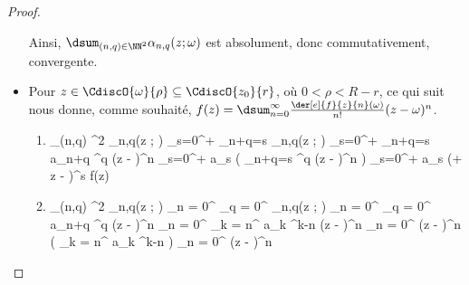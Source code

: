 \begin{proof}
\begin{itemize}
		\noindent
		Ainsi,
		$\dsum_{(n,q) \in \NN^2} \alpha_{n,q}(z ; \omega)$
		est absolument, donc commutativement, convergente.
	

		\item Pour $z \in \CdiscO{\omega}{\rho} \subseteq \CdiscO{z_0}{r}$, où $0 < \rho < R - r$, ce qui suit nous donne, comme souhaité,
		$f(z) = \dsum_{n = 0}^{\infty} \frac{\der[e]{f}{z}{n}(\omega)}{n!} (z - \omega)^n$.

        \begin{multicols}{2}
        	\setlength{\columnseprule}{.75pt}
	        \begin{enumerate}[wide]
    			\item
        		\begin{stepcalc}[style=ar*]
        			\dsum_{(n,q) \in \NN^2} \alpha_{n,q}(z ; \omega)
        		\explnext{}
        			\dsum_{s=0}^{+\infty} \dsum_{n+q=s} \alpha_{n,q}(z ; \omega)
        		\explnext{}
        			\dsum_{s=0}^{+\infty} \dsum_{n+q=s}  a_{n+q} \omega^q (z - \omega)^n
        		\explnext{}
        			\dsum_{s=0}^{+\infty} a_s \big( \dsum_{n+q=s}  \omega^q (z - \omega)^n \big)
        		\explnext{}
        			\dsum_{s=0}^{+\infty} a_s (\omega + z - \omega)^s
        		\explnext{}
        			f(z)
        		\end{stepcalc}


    			\item
        		\begin{stepcalc}[style=ar*]
        			\dsum_{(n,q) \in \NN^2} \alpha_{n,q}(z ; \omega)
        		\explnext{}
        			\dsum_{n = 0}^{\infty} \dsum_{q = 0}^{\infty} \alpha_{n,q}(z ; \omega)
        		\explnext{}
        			\dsum_{n = 0}^{\infty} \dsum_{q = 0}^{\infty}  a_{n+q} \omega^q (z - \omega)^n
        		\explnext{}
        			\dsum_{n = 0}^{\infty} \dsum_{k = n}^{\infty}  a_{k} \omega^{k-n} (z - \omega)^n
        		\explnext{}
        			\dsum_{n = 0}^{\infty}  (z - \omega)^n \big( \dsum_{k = n}^{\infty}  a_{k} \omega^{k-n} \big) 
        		\explnext{}
        			\dsum_{n = 0}^{\infty}  (z - \omega)^n
        		\end{stepcalc}
    		\end{enumerate}
	\end{multicols}
	\end{itemize}

	\null\vspace{-8ex}
\end{proof}


